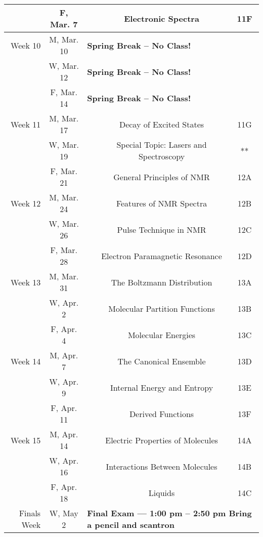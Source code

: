 \begin{tabular}{rcccc}
& F, Mar. 7&& Electronic Spectra & 11F\\
\midrule
Week 10 & M, Mar. 10& \multicolumn{3}{l}{\textbf{Spring Break -- No Class!}}\\
& W, Mar. 12& \multicolumn{3}{l}{\textbf{Spring Break -- No Class!}}\\
& F, Mar. 14& \multicolumn{3}{l}{\textbf{Spring Break -- No Class!}}\\
\midrule
Week 11 & M, Mar. 17&& Decay of Excited States & 11G\\
& W, Mar. 19&& Special Topic: Lasers and Spectroscopy & **\\
& F, Mar. 21&& General Principles of NMR & 12A\\
\midrule
Week 12 & M, Mar. 24&& Features of NMR Spectra & 12B\\
& W, Mar. 26&& Pulse Technique in NMR & 12C\\
& F, Mar. 28&& Electron Paramagnetic Resonance & 12D\\
\midrule
Week 13 & M, Mar. 31&& The Boltzmann Distribution & 13A\\
& W, Apr. 2&& Molecular Partition Functions & 13B\\
& F, Apr. 4&& Molecular Energies & 13C\\
\midrule
Week 14 & M, Apr. 7&& The Canonical Ensemble & 13D\\
& W, Apr. 9&& Internal Energy and Entropy & 13E\\
& F, Apr. 11&& Derived Functions & 13F\\
\midrule
Week 15 & M, Apr. 14&& Electric Properties of Molecules & 14A\\
& W, Apr. 16&& Interactions Between Molecules & 14B\\
& F, Apr. 18&& Liquids & 14C\\
\midrule
Finals Week& W, May 2& \multicolumn{3}{l}{\textbf{Final Exam --- 1:00 pm -- 2:50 pm Bring a pencil and scantron}}\\
\end{tabular}